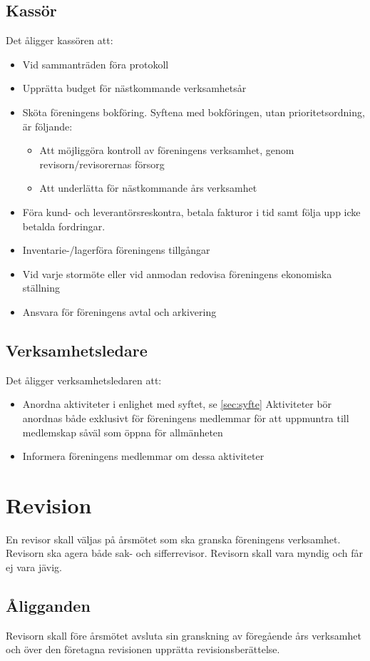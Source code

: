 \documentclass[11pt,a4paper]{article}
\begin{document}
\subsection{Kassör}\label{sec:cash}
Det åligger kassören att:
\begin{itemize}
	\item Vid sammanträden föra protokoll
	\item Upprätta budget för nästkommande verksamhetsår
	\item Sköta föreningens bokföring. Syftena med bokföringen, utan prioritetsordning, är följande:
\begin{itemize}
	\item Att möjliggöra kontroll av föreningens verksamhet, genom revisorn/revisorernas försorg
	\item Att underlätta för nästkommande års verksamhet
\end{itemize}
\item Föra kund- och leverantörsreskontra, betala fakturor i tid samt följa upp icke betalda fordringar.
\item Inventarie-/lagerföra föreningens tillgångar
\item Vid varje stormöte eller vid anmodan redovisa föreningens ekonomiska ställning
\item Ansvara för föreningens avtal och arkivering
\end{itemize}
\subsection{Verksamhetsledare}\label{sec:event}
Det åligger verksamhetsledaren att:
\begin{itemize}
\item Anordna aktiviteter i enlighet med syftet, se \ref{sec:syfte} Aktiviteter bör anordnas både exklusivt för föreningens medlemmar för att uppmuntra till medlemskap såväl som öppna för allmänheten
\item Informera föreningens medlemmar om dessa aktiviteter
\end{itemize}

\section{Revision}
En revisor skall väljas på årsmötet som ska granska föreningens verksamhet. Revisorn ska agera både sak- och sifferrevisor. Revisorn skall vara myndig och får ej vara jävig.
\subsection{Åligganden}
Revisorn skall före årsmötet avsluta sin granskning av föregående års verksamhet och över den företagna revisionen upprätta revisionsberättelse.
\end{document}
